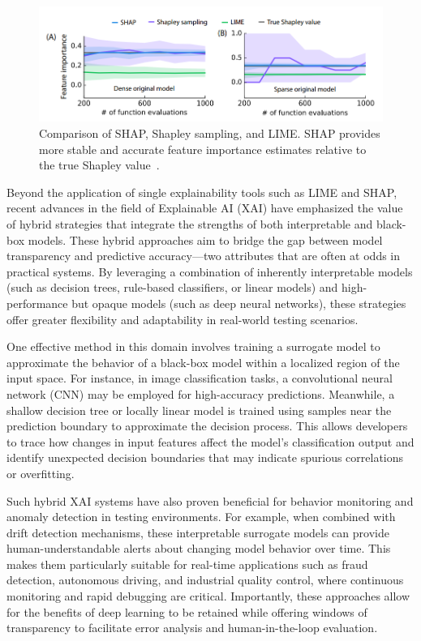 \documentclass[manuscript,screen,review]{acmart}
\begin{document}
\begin{figure}[htbp]
  \centering
  \includegraphics[width=0.85\linewidth]{picture/5.2fig2.png}
  \caption{Comparison of SHAP, Shapley sampling, and LIME. SHAP provides more stable and accurate feature importance estimates relative to the true Shapley value~\cite{Lundberg2017}.}
  \label{fig:shap}
\end{figure}

Beyond the application of single explainability tools such as LIME and SHAP, recent advances in the field of Explainable AI (XAI) have emphasized the value of hybrid strategies that integrate the strengths of both interpretable and black-box models. These hybrid approaches aim to bridge the gap between model transparency and predictive accuracy—two attributes that are often at odds in practical systems. By leveraging a combination of inherently interpretable models (such as decision trees, rule-based classifiers, or linear models) and high-performance but opaque models (such as deep neural networks), these strategies offer greater flexibility and adaptability in real-world testing scenarios.

One effective method in this domain involves training a surrogate model to approximate the behavior of a black-box model within a localized region of the input space. For instance, in image classification tasks, a convolutional neural network (CNN) may be employed for high-accuracy predictions. Meanwhile, a shallow decision tree or locally linear model is trained using samples near the prediction boundary to approximate the decision process. This allows developers to trace how changes in input features affect the model's classification output and identify unexpected decision boundaries that may indicate spurious correlations or overfitting.

Such hybrid XAI systems have also proven beneficial for behavior monitoring and anomaly detection in testing environments. For example, when combined with drift detection mechanisms, these interpretable surrogate models can provide human-understandable alerts about changing model behavior over time. This makes them particularly suitable for real-time applications such as fraud detection, autonomous driving, and industrial quality control, where continuous monitoring and rapid debugging are critical. Importantly, these approaches allow for the benefits of deep learning to be retained while offering windows of transparency to facilitate error analysis and human-in-the-loop evaluation.
\end{document}
